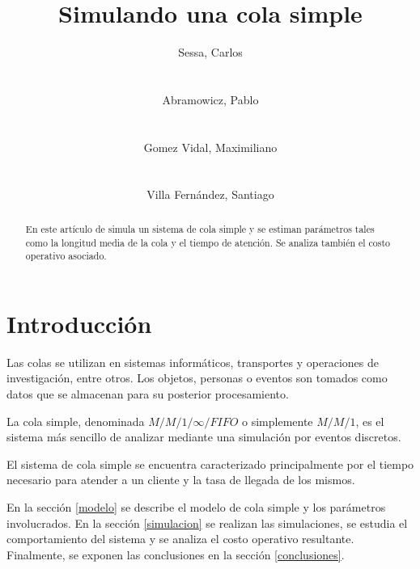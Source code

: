 \documentclass{sig-alternate}
\begin{document}
\title{Simulando una cola simple}


\author{
    \alignauthor
    Sessa, Carlos\\
     \\
    \ \\
    Abramowicz, Pablo\\
     \\
    \ \\
    \alignauthor
    Gomez Vidal, Maximiliano\\
     \\
    \ \\
    Villa Fern\'{a}ndez, Santiago\\
}

\maketitle

\begin{abstract}
En este art\'{i}culo de simula un sistema de cola simple y se estiman
par\'{a}metros tales como la longitud media de la cola y el tiempo de
atenci\'{o}n. Se analiza tambi\'{e}n el costo operativo asociado.
\end{abstract}


\section{Introducci\'{o}n}\label{introduccion}

Las colas se utilizan en sistemas inform\'{a}ticos, transportes y operaciones 
de investigaci\'{o}n, entre otros. Los objetos, personas o eventos son tomados 
como datos que se almacenan para su posterior procesamiento.


La cola simple, denominada $M/M/1/\infty/FIFO$ o simplemente $M/M/1$, es el 
sistema m\'{a}s sencillo de analizar mediante una simulaci\'{o}n por eventos 
discretos.


El sistema de cola simple se encuentra caracterizado principalmente por el 
tiempo necesario para atender a un cliente y la tasa de llegada de los mismos.


En la secci\'{o}n \ref{modelo} se describe el modelo de cola simple y los
par\'{a}metros involucrados. En la secci\'{o}n \ref{simulacion} se realizan
las simulaciones, se estudia el comportamiento del sistema y se analiza
el costo operativo resultante. Finalmente, se exponen las conclusiones en 
la secci\'{o}n \ref{conclusiones}.
\end{document}
